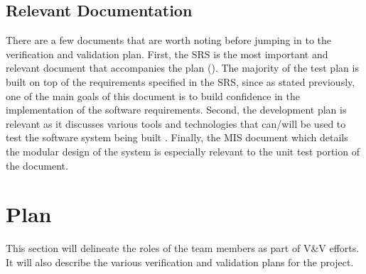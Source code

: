 \documentclass[12pt, titlepage]{article}
\begin{document}
\subsection{Relevant Documentation}

There are a few documents that are worth noting before jumping in to the verification and validation plan.
First, the SRS is the most important and relevant document that accompanies the plan  (\citet{SRS}). The majority of the test plan 
is built on top of the requirements specified in the SRS, since as stated previously, one of the main goals of this document is to 
build confidence in the implementation of the software requirements. Second, the development plan is relevant as it discusses various tools 
and technologies that can/will be used to test the software system being built {\citet{DevPlan}}. Finally, the MIS document which details the modular design 
of the system is especially relevant to the unit test portion of the document.

\section{Plan}
This section will delineate the roles of the team members as part of V\&V efforts. 
It will also describe the various verification and validation plans for the project.
\end{document}
